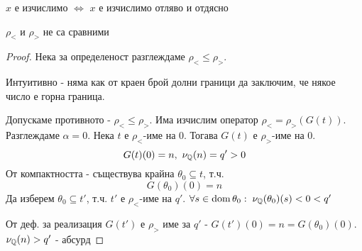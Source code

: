 \begin{proposition}
    $x$ е изчислимо $\iff$ $x$ е изчислимо отляво и отдясно
\end{proposition}
\begin{proposition}
    $\rho_<$ и $\rho_>$ не са сравними
\end{proposition}
\begin{proof}
    Нека за определеност разглеждаме $\rho_< \leq \rho_>$.

    Интуитивно - няма как от краен брой долни граници да заключим, че някое число е горна граница.

    Допускаме противното - $\rho_< \leq \rho_>$. Има изчислим оператор $\rho_< = \rho_>(G(t))$. Разглеждаме $\alpha=0$. Нека $t$ е $\rho_<$-име на 0. Тогава $G(t)$ е $\rho_>$-име на 0.
    \begin{equation}
        G(t)(0) = n,\ \nu_{\mathbb{Q}}(n) = q' > 0
    \end{equation}
    От компактността - съществува крайна $\theta_0 \subseteq t$, т.ч. 
    \begin{equation}
        G(\theta_0)(0) = n
    \end{equation}
    Да изберем $\theta_0 \subseteq t'$, т.ч. $t'$ е $\rho_<$-име на $q'$. $\forall s \in \operatorname*{dom}\theta_0:\; \nu_{\mathbb{Q}}(\theta_0)(s) < 0 < q'$

    От деф. за реализация $G(t')$ е $\rho_>$ име за $q'$ - $G(t')(0) = n = G(\theta_0)(0)$. $\nu_{\mathbb{Q}}(n) > q'$ - абсурд 
\end{proof}

